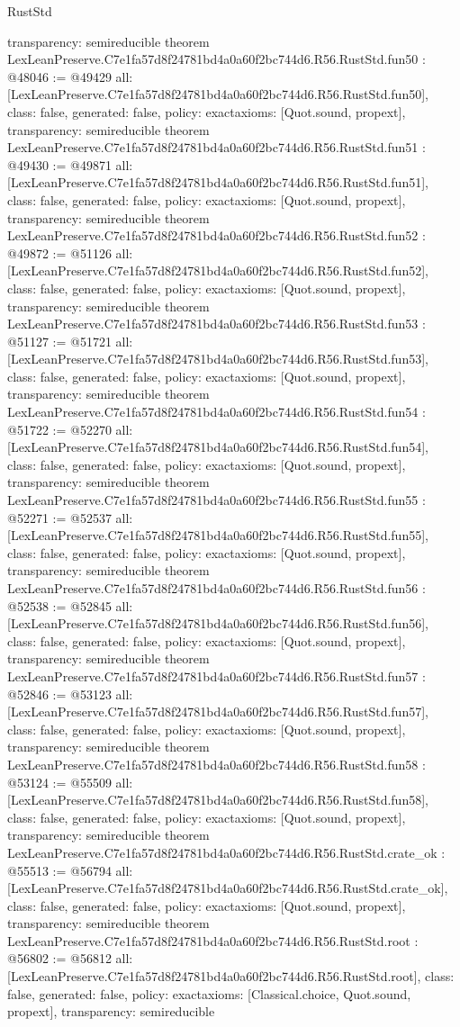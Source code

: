 \begin{lexlean}{RustStd}
\begin{coremodule}
{  transparency: semireducible
}
theorem LexLeanPreserve.C7e1fa57d8f24781bd4a0a60f2bc744d6.R56.RustStd.fun50 : @48046 := @49429 {
  all: [LexLeanPreserve.C7e1fa57d8f24781bd4a0a60f2bc744d6.R56.RustStd.fun50],
  class: false,
  generated: false,
  policy: exact{axioms: [Quot.sound, propext]},
  transparency: semireducible
}
theorem LexLeanPreserve.C7e1fa57d8f24781bd4a0a60f2bc744d6.R56.RustStd.fun51 : @49430 := @49871 {
  all: [LexLeanPreserve.C7e1fa57d8f24781bd4a0a60f2bc744d6.R56.RustStd.fun51],
  class: false,
  generated: false,
  policy: exact{axioms: [Quot.sound, propext]},
  transparency: semireducible
}
theorem LexLeanPreserve.C7e1fa57d8f24781bd4a0a60f2bc744d6.R56.RustStd.fun52 : @49872 := @51126 {
  all: [LexLeanPreserve.C7e1fa57d8f24781bd4a0a60f2bc744d6.R56.RustStd.fun52],
  class: false,
  generated: false,
  policy: exact{axioms: [Quot.sound, propext]},
  transparency: semireducible
}
theorem LexLeanPreserve.C7e1fa57d8f24781bd4a0a60f2bc744d6.R56.RustStd.fun53 : @51127 := @51721 {
  all: [LexLeanPreserve.C7e1fa57d8f24781bd4a0a60f2bc744d6.R56.RustStd.fun53],
  class: false,
  generated: false,
  policy: exact{axioms: [Quot.sound, propext]},
  transparency: semireducible
}
theorem LexLeanPreserve.C7e1fa57d8f24781bd4a0a60f2bc744d6.R56.RustStd.fun54 : @51722 := @52270 {
  all: [LexLeanPreserve.C7e1fa57d8f24781bd4a0a60f2bc744d6.R56.RustStd.fun54],
  class: false,
  generated: false,
  policy: exact{axioms: [Quot.sound, propext]},
  transparency: semireducible
}
theorem LexLeanPreserve.C7e1fa57d8f24781bd4a0a60f2bc744d6.R56.RustStd.fun55 : @52271 := @52537 {
  all: [LexLeanPreserve.C7e1fa57d8f24781bd4a0a60f2bc744d6.R56.RustStd.fun55],
  class: false,
  generated: false,
  policy: exact{axioms: [Quot.sound, propext]},
  transparency: semireducible
}
theorem LexLeanPreserve.C7e1fa57d8f24781bd4a0a60f2bc744d6.R56.RustStd.fun56 : @52538 := @52845 {
  all: [LexLeanPreserve.C7e1fa57d8f24781bd4a0a60f2bc744d6.R56.RustStd.fun56],
  class: false,
  generated: false,
  policy: exact{axioms: [Quot.sound, propext]},
  transparency: semireducible
}
theorem LexLeanPreserve.C7e1fa57d8f24781bd4a0a60f2bc744d6.R56.RustStd.fun57 : @52846 := @53123 {
  all: [LexLeanPreserve.C7e1fa57d8f24781bd4a0a60f2bc744d6.R56.RustStd.fun57],
  class: false,
  generated: false,
  policy: exact{axioms: [Quot.sound, propext]},
  transparency: semireducible
}
theorem LexLeanPreserve.C7e1fa57d8f24781bd4a0a60f2bc744d6.R56.RustStd.fun58 : @53124 := @55509 {
  all: [LexLeanPreserve.C7e1fa57d8f24781bd4a0a60f2bc744d6.R56.RustStd.fun58],
  class: false,
  generated: false,
  policy: exact{axioms: [Quot.sound, propext]},
  transparency: semireducible
}
theorem LexLeanPreserve.C7e1fa57d8f24781bd4a0a60f2bc744d6.R56.RustStd.crate_ok : @55513 := @56794 {
  all: [LexLeanPreserve.C7e1fa57d8f24781bd4a0a60f2bc744d6.R56.RustStd.crate_ok],
  class: false,
  generated: false,
  policy: exact{axioms: [Quot.sound, propext]},
  transparency: semireducible
}
theorem LexLeanPreserve.C7e1fa57d8f24781bd4a0a60f2bc744d6.R56.RustStd.root : @56802 := @56812 {
  all: [LexLeanPreserve.C7e1fa57d8f24781bd4a0a60f2bc744d6.R56.RustStd.root],
  class: false,
  generated: false,
  policy: exact{axioms: [Classical.choice, Quot.sound, propext]},
  transparency: semireducible
}


\end{coremodule}
\end{lexlean}
